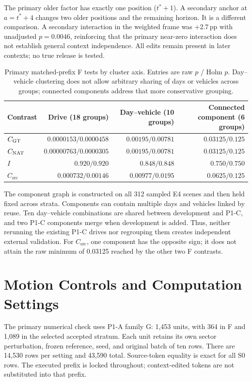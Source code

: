 The primary older factor has exactly one position ($t^*+1$). A secondary anchor at $a=t^*+4$ changes two older positions and the remaining horizon. It is a different comparison. A secondary interaction in the weighted frame was $+2.7$\,pp with unadjusted $p=0.0046$, reinforcing that the primary near-zero interaction does not establish general context independence. All edits remain present in later contexts; no true release is tested.

\begin{table}[ht]
\centering\small
\caption{Primary matched-prefix F tests by cluster axis. Entries are raw $p$ / Holm $p$. Day--vehicle clustering does not allow arbitrary sharing of days or vehicles across groups; connected components address that more conservative grouping.}
\label{tab:cluster}
\begin{tabular}{@{}lrrr@{}}\toprule
Contrast & Drive (18 groups) & Day--vehicle (10 groups) & Connected component (6 groups)\\\midrule
$C_{\mathrm{GT}}$ & $0.0000153/0.0000458$ & $0.00195/0.00781$ & $0.03125/0.125$\\
$C_{\mathrm{NAT}}$ & $0.00000763/0.0000305$ & $0.00195/0.00781$ & $0.03125/0.125$\\
$I$ & $0.920/0.920$ & $0.848/0.848$ & $0.750/0.750$\\
$C_{\mathrm{src}}$ & $0.000732/0.00146$ & $0.00977/0.0195$ & $0.0625/0.125$\\\bottomrule
\end{tabular}
\end{table}

The component graph is constructed on all 312 sampled E4 scenes and then held fixed across strata. Components can contain multiple days and vehicles linked by reuse. Ten day--vehicle combinations are shared between development and P1-C, and two P1-C components merge when development is added. Thus, neither rerunning the existing P1-C drives nor regrouping them creates independent external validation. For $C_{\mathrm{src}}$, one component has the opposite sign; it does not attain the raw minimum of 0.03125 reached by the other two F contrasts.

\section{Motion Controls and Computation Settings}
\label{app:motion}
The primary numerical check uses P1-A family G: 1,453 units, with 364 in F and 1,089 in the selected accepted stratum. Each unit retains its own sector perturbation, frozen reference, seed, and original batch of ten rows. There are 14,530 rows per setting and 43,590 total. Source-token equality is exact for all S0 rows. The executed prefix is locked throughout; context-edited tokens are not substituted into that prefix.

